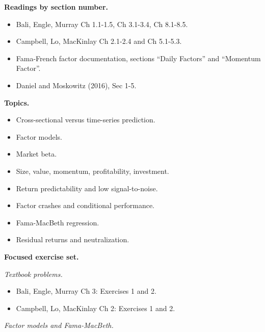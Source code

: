 \textbf{Readings by section number.}

\begin{itemize}
\tightlist
\item
  Bali, Engle, Murray Ch 1.1-1.5, Ch 3.1-3.4, Ch 8.1-8.5.
\item
  Campbell, Lo, MacKinlay Ch 2.1-2.4 and Ch 5.1-5.3.
\item
  Fama-French factor documentation, sections ``Daily Factors'' and
  ``Momentum Factor''.
\item
  Daniel and Moskowitz (2016), Sec 1-5.
\end{itemize}

\textbf{Topics.}

\begin{itemize}
\tightlist
\item
  Cross-sectional versus time-series prediction.
\item
  Factor models.
\item
  Market beta.
\item
  Size, value, momentum, profitability, investment.
\item
  Return predictability and low signal-to-noise.
\item
  Factor crashes and conditional performance.
\item
  Fama-MacBeth regression.
\item
  Residual returns and neutralization.
\end{itemize}

\textbf{Focused exercise set.}

\emph{Textbook problems.}

\begin{itemize}
\tightlist
\item
  Bali, Engle, Murray Ch 3: Exercises 1 and 2.
\item
  Campbell, Lo, MacKinlay Ch 2: Exercises 1 and 2.
\end{itemize}

\emph{Factor models and Fama-MacBeth.}

